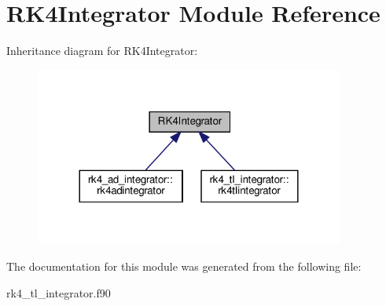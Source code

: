 \hypertarget{classRK4Integrator}{}\section{R\+K4\+Integrator Module Reference}
\label{classRK4Integrator}


Inheritance diagram for R\+K4\+Integrator\+:\nopagebreak
\begin{figure}[H]
\begin{center}
\leavevmode
\includegraphics[width=288pt]{classRK4Integrator__inherit__graph}
\end{center}
\end{figure}


The documentation for this module was generated from the following file\+:\begin{DoxyCompactItemize}
\item 
rk4\+\_\+tl\+\_\+integrator.\+f90\end{DoxyCompactItemize}
